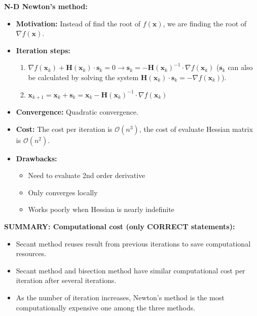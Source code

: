 \documentclass[12pt]{article}
\begin{document}
\newpage
\noindent \textbf{N-D Newton's method:} 
    \begin{itemize}
        \item \textbf{Motivation:} Instead of find the root of $f(\mathbf{x})$, we are finding the root of $\nabla f(\mathbf{x})$.
    \item \textbf{Iteration steps:}
        \begin{enumerate}
            \item $\nabla f(\mathbf{x}_k) + \mathbf{H}(\mathbf{x}_k) \cdot \mathbf{s}_k = 0 \to \mathbf{s}_k = - \mathbf{H}(\mathbf{x}_k)^{-1} \cdot \nabla f(\mathbf{x}_k)$ ($\mathbf{s}_k$ can also be calculated by solving the system $\mathbf{H}(\mathbf{x}_k) \cdot \mathbf{s}_k = - \nabla f(\mathbf{x}_k)$). 
            \item $\mathbf{x}_{k+1} = \mathbf{x}_k + \mathbf{s}_k = \mathbf{x}_k - \mathbf{H}(\mathbf{x}_k)^{-1} \cdot \nabla f(\mathbf{x}_k)$
        \end{enumerate}
    \item \textbf{Convergence:} Quadratic convergence.
    \item \textbf{Cost:} The cost per iteration is $\mathcal{O}(n^3)$, the cost of evaluate Hessian matrix is $\mathcal{O}(n^2)$.
    \item \textbf{Drawbacks:}
        \begin{itemize}
            \item Need to evaluate 2nd order derivative
            \item Only converges locally
            \item Works poorly when Hessian is nearly indefinite
        \end{itemize}
\end{itemize}

\medskip
\noindent \textbf{SUMMARY: Computational cost (only CORRECT statements):}
\begin{itemize} [label={\checkmark}]
    \item Secant method reuses result from previous iterations to save computational resources.
    \item Secant method and bisection method have similar computational cost per iteration after several iterations.
    \item As the number of iteration increases, Newton's method is the most computationally expensive one among the three methods.
\end{itemize}
\end{document}
